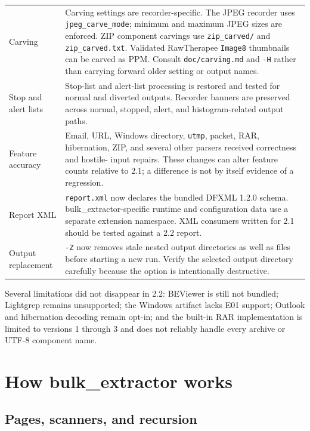 \documentclass[11pt]{article}
\newcommand{\code}[1]{\texttt{#1}}
\begin{document}
\begin{longtable}{p{.25\linewidth}p{.69\linewidth}}
Carving & Carving settings are recorder-specific. The JPEG recorder uses
\code{jpeg\_carve\_mode}; minimum and maximum JPEG sizes are enforced. ZIP
component carvings use \code{zip\_carved/} and \code{zip\_carved.txt}.
Validated RawTherapee \code{Image8} thumbnails can be carved as PPM. Consult
\code{doc/carving.md} and \code{-H} rather than carrying forward older setting
or output names. \\

Stop and alert lists & Stop-list and alert-list processing is restored and
tested for normal and diverted outputs. Recorder banners are preserved across
normal, stopped, alert, and histogram-related output paths. \\

Feature accuracy & Email, URL, Windows directory, \code{utmp}, packet, RAR,
hibernation, ZIP, and several other parsers received correctness and hostile-
input repairs. These changes can alter feature counts relative to 2.1; a
difference is not by itself evidence of a regression. \\

Report XML & \code{report.xml} now declares the bundled DFXML 1.2.0 schema.
bulk\_extractor-specific runtime and configuration data use a separate
extension namespace. XML consumers written for 2.1 should be tested against a
2.2 report. \\

Output replacement & \code{-Z} now removes stale nested output directories as
well as files before starting a new run. Verify the selected output directory
carefully because the option is intentionally destructive. \\
\bottomrule
\end{longtable}

Several limitations did not disappear in 2.2: BEViewer is still not bundled;
Lightgrep remains unsupported; the Windows artifact lacks E01 support; Outlook
and hibernation decoding remain opt-in; and the built-in RAR implementation is
limited to versions 1 through 3 and does not reliably handle every archive or
UTF-8 component name.

\section{How bulk\_extractor works}

\subsection{Pages, scanners, and recursion}
\end{document}
